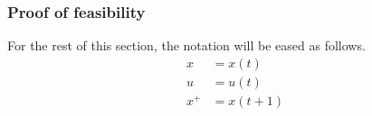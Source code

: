 %



\subsubsection*{Proof of feasibility}
For the rest of this section, the notation will be eased as follows. 
\begin{align*}
	x &= x(t)\\
	u &= u(t)\\
	x^+ &= x(t+1)
\end{align*}\\

